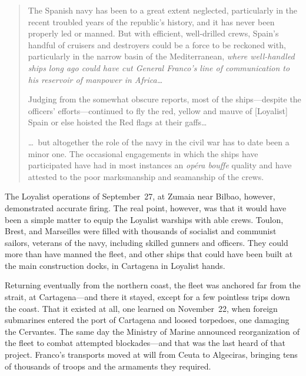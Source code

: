 \indexNYT{}
\begin{quotation}
  The Spanish navy has been to a great extent neglected, particularly in the recent troubled years of the republic’s history, and it has never been properly led or manned. But with efficient, well-drilled crews, Spain’s handful of cruisers and destroyers could be a force to be reckoned with, particularly in the narrow basin of the Mediterranean, \emph{where well-handled ships long ago could have cut General Franco’s line of communication to his reservoir of manpower in Africa\dots}
  
  Judging from the somewhat obscure reports, most of the ships---despite the officers’ efforts---continued to fly the red, yellow and mauve of [Loyalist] Spain or else hoisted the Red flags at their gaffs\dots
  
  \dots\ but altogether the role of the navy in the civil war has to date been a minor one. The occasional engagements in which the ships have participated have had in most instances an \emph{op\'era bouffe} quality and have attested to the poor marksmanship and seamanship of the crews.
\end{quotation}

The Loyalist operations of September~27, at Zumaia near Bilbao, however, demonstrated accurate firing. The real point, however, was that it would have been a simple matter to equip the Loyalist warships with able crews. Toulon, Brest, and Marseilles were filled with thousands of socialist and communist sailors, veterans of the navy, including skilled gunners and officers. They could more than have manned the fleet, and other ships that could have been built at the main construction docks, in Cartagena in Loyalist hands.

Returning eventually from the northern coast, the fleet was anchored far from the strait, at Cartagena---and there it stayed, except for a few pointless trips down the coast. That it existed at all, one learned on November~22, when foreign submarines entered the port of Cartagena and loosed torpedoes, one damaging the Cervantes. The same day the Ministry of Marine announced reorganization of the fleet to combat attempted blockades---and that was the last heard of that project. Franco’s transports moved at will from Ceuta to Algeciras, bringing tens of thousands of troops and the armaments they required.

